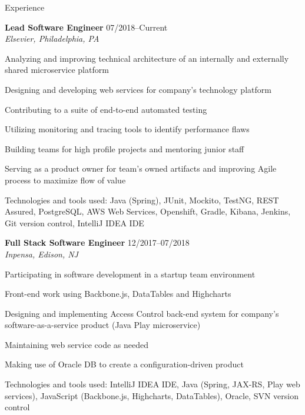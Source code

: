 \begin{Large}\textsf{Experience}\end{Large} \vspace{-2mm}

\begin{itemize1}
	\item \textbf{Lead Software Engineer} \textopenbullet{} 07/2018--Current \\
		\textit{Elsevier, Philadelphia, PA} \vspace{-1.5mm}
		\begin{itemize1}
			\item Analyzing and improving technical architecture of an internally and externally shared microservice platform
			\item Designing and developing web services for company's technology platform
			\item Contributing to a suite of end-to-end automated testing 
			\item Utilizing monitoring and tracing tools to identify performance flaws
			\item Building teams for high profile projects and mentoring junior staff
			\item Serving as a product owner for team's owned artifacts and improving Agile process to maximize flow of value
			\item Technologies and tools used: Java (Spring), JUnit, Mockito, TestNG, REST Assured, PostgreSQL, AWS Web Services, Openshift, Gradle, Kibana, Jenkins, Git version control, IntelliJ IDEA IDE
		\end{itemize1}
\end{itemize1}

\begin{itemize1}
	\item \textbf{Full Stack Software Engineer} \textopenbullet{} 12/2017--07/2018 \\
		\textit{Inpensa, Edison, NJ} \vspace{-1.5mm}
		\begin{itemize1}
			\item Participating in software development in a startup team environment
			\item Front-end work using Backbone.js, DataTables and Highcharts
			\item Designing and implementing Access Control back-end system for company's software-as-a-service product (Java Play microservice)
			\item Maintaining web service code as needed
			\item Making use of Oracle DB to create a configuration-driven product
			\item Technologies and tools used: IntelliJ IDEA IDE, Java (Spring, JAX-RS, Play web services), JavaScript (Backbone.js, Highcharts, DataTables), Oracle, SVN version control
		\end{itemize1}
\end{itemize1}

